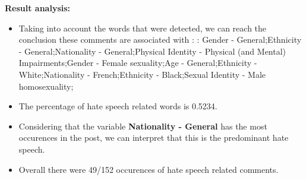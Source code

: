 \documentclass[11pt]{article}
\begin{document}
\textbf{\Large Result analysis:}

\begin{itemize}\item Taking into account the words that were detected, we can reach the conclusion these comments are associated with : : Gender - General;Ethnicity - General;Nationality - General;Physical Identity - Physical (and Mental) Impairments;Gender - Female sexuality;Age - General;Ethnicity - White;Nationality - French;Ethnicity - Black;Sexual Identity - Male homosexuality;%

\item The percentage of hate speech related words is 0.5234.

\item Considering that the variable \textbf{Nationality - General} has the most occurences in the post, we can interpret that this is the predominant hate speech.

\item Overall there were 49/152 occurences of hate speech related comments.\end{itemize}
\end{document}
